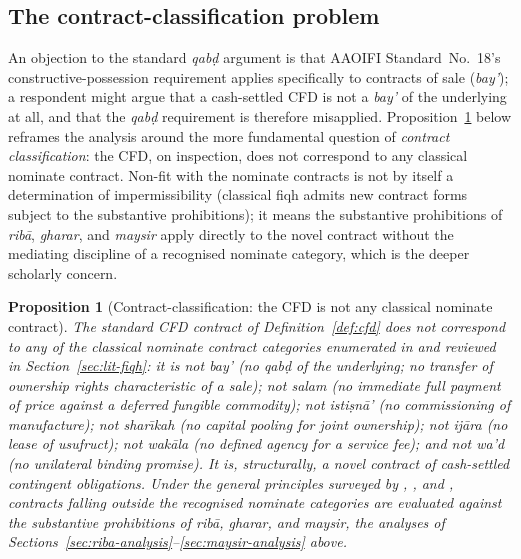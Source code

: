 \documentclass[preprint,12pt,authoryear]{elsarticle}
\newtheorem{proposition}{Proposition}[section]
\theoremstyle{definition}
\begin{document}
\subsection{The contract-classification problem}
\label{sec:qabd-analysis}

An objection to the standard \emph{qab\d{d}} argument is that
AAOIFI Standard~No.~18's constructive-possession requirement
applies specifically to contracts of sale (\emph{bay'}); a
respondent might argue that a cash-settled CFD is not a
\emph{bay'} of the underlying at all, and that the \emph{qab\d{d}}
requirement is therefore misapplied. Proposition~\ref{prop:qabd}
below reframes the analysis around the more fundamental question
of \emph{contract classification}: the CFD, on inspection, does
not correspond to any classical nominate contract. Non-fit with
the nominate contracts is not by itself a determination of
impermissibility (classical fiqh admits new contract forms
subject to the substantive prohibitions); it means the
substantive prohibitions of \emph{rib\={a}}, \emph{gharar}, and
\emph{maysir} apply directly to the novel contract without the
mediating discipline of a recognised nominate category, which is
the deeper scholarly concern.

\begin{proposition}[Contract-classification: the CFD is not any
    classical nominate contract]
\label{prop:qabd}
The standard CFD contract of Definition~\ref{def:cfd} does not
correspond to any of the classical nominate contract categories
enumerated in \citet[Sec.~2.1]{AAOIFI2015} and reviewed in
Section~\ref{sec:lit-fiqh}: it is not \emph{bay'} (no
\emph{qab\d{d}} of the underlying; no transfer of ownership rights
characteristic of a sale); not \emph{salam} (no immediate full
payment of price against a deferred fungible commodity); not
\emph{isti\d{s}n\={a}'} (no commissioning of manufacture);
not \emph{shar\={\i}kah} (no capital pooling for joint ownership);
not \emph{ij\={a}ra} (no lease of usufruct);
not \emph{wak\={a}la} (no defined agency for a service fee); and
not \emph{wa'd} (no unilateral binding promise). It is,
structurally, a novel contract of cash-settled contingent
obligations. Under the general principles surveyed by
\citet{Kamali2000}, \citet{Usmani2002}, and \citet{ElGamal2006},
contracts falling outside the recognised nominate categories are
evaluated against the substantive prohibitions of
\emph{rib\={a}}, \emph{gharar}, and \emph{maysir}, the analyses
of Sections~\ref{sec:riba-analysis}--\ref{sec:maysir-analysis}
above.
\end{proposition}
\end{document}
